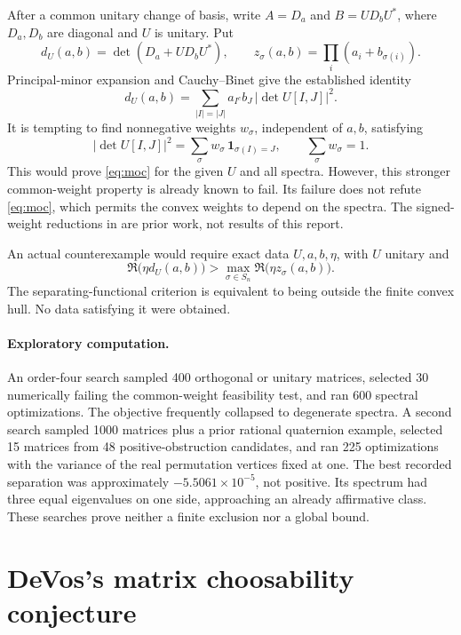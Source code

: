 \documentclass[11pt,a4paper]{article}
\begin{document}
After a common unitary change of basis, write $A=D_a$ and
$B=UD_bU^*$, where $D_a,D_b$ are diagonal and $U$ is unitary. Put
\[
 d_U(a,b)=\det(D_a+UD_bU^*),\qquad
 z_\sigma(a,b)=\prod_i(a_i+b_{\sigma(i)}).
\]
Principal-minor expansion and Cauchy--Binet give the established identity
\begin{equation}\label{eq:minor}
 d_U(a,b)=\sum_{|I|=|J|}a_{I^c}b_J\,|\det U[I,J]|^2.
\end{equation}
It is tempting to find nonnegative weights $w_\sigma$, independent of
$a,b$, satisfying
\[
 |\det U[I,J]|^2
 =\sum_\sigma w_\sigma\,\mathbf1_{\sigma(I)=J},
 \qquad \sum_\sigma w_\sigma=1.
\]
This would prove \eqref{eq:moc} for the given $U$ and all spectra.
However, this stronger common-weight property is already known to fail.
Its failure does not refute \eqref{eq:moc}, which permits the convex
weights to depend on the spectra. The signed-weight reductions in
\cite{Holden} are prior work, not results of this report.

An actual counterexample would require exact data $U,a,b,\eta$, with $U$
unitary and
\begin{equation}\label{eq:separation}
 \Re\bigl(\eta d_U(a,b)\bigr)
 >\max_{\sigma\in S_n}\Re\bigl(\eta z_\sigma(a,b)\bigr).
\end{equation}
The separating-functional criterion is equivalent to being outside the
finite convex hull. No data satisfying it were obtained.

\paragraph{Exploratory computation.}
An order-four search sampled 400 orthogonal or unitary matrices, selected
30 numerically failing the common-weight feasibility test, and ran 600
spectral optimizations. The objective frequently collapsed to degenerate
spectra. A second search sampled 1000 matrices plus a prior rational
quaternion example, selected 15 matrices from 48 positive-obstruction
candidates, and ran 225 optimizations with the variance of the real
permutation vertices fixed at one. The best recorded separation was
approximately $-5.5061\times10^{-5}$, not positive. Its spectrum had three
equal eigenvalues on one side, approaching an already affirmative class.
These searches prove neither a finite exclusion nor a global bound.

\section{DeVos's matrix choosability conjecture}
\end{document}
